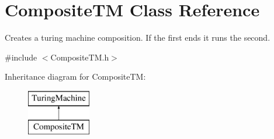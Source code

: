 \hypertarget{class_composite_t_m}{}\section{Composite\+TM Class Reference}
\label{class_composite_t_m}


Creates a turing machine composition. If the first ends it runs the second.  




{\ttfamily \#include $<$Composite\+T\+M.\+h$>$}

Inheritance diagram for Composite\+TM\+:\begin{figure}[H]
\begin{center}
\leavevmode
\includegraphics[height=2.000000cm]{class_composite_t_m}
\end{center}
\end{figure}
